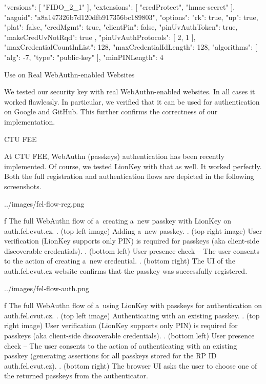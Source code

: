 \begtt
{
	"versions": [
		"FIDO_2_1"
	],
	"extensions": [
		"credProtect",
		"hmac-secret"
	],
	"aaguid": "a8a147326b7d120dfb917356bc189803",
	"options": {
		"rk": true,
		"up": true,
		"plat": false,
		"credMgmt": true,
		"clientPin": false,
		"pinUvAuthToken": true,
		"makeCredUvNotRqd": true
	},
	"pinUvAuthProtocols": [
		2,
		1
	],
	"maxCredentialCountInList": 128,
	"maxCredentialIdLength": 128,
	"algorithms": [
		{
			"alg": -7,
			"type": "public-key"
		}
	],
	"minPINLength": 4
}
\endtt


\sec Use on Real WebAuthn-enabled Websites

We tested our security key with real WebAuthn-enabled websites. In all cases it worked flawlessly. In particular, we verified that it can be used for authentication on {\sbf Google} and {\sbf GitHub}. This further confirms the correctness of our implementation.


\secc CTU FEE

At CTU FEE, WebAuthn (passkeys) authentication has been recently implemented. Of course, we tested LionKey with that as well. It worked perfectly. Both the full registration and authentication flows are depicted in the following screenshots.

\midinsert
{}
\picw=144mm \cinspic ../images/fel-flow-reg.png
\caption/f The full WebAuthn flow of a~creating a~new passkey with LionKey on auth.fel.cvut.cz. {.} (top left image) Adding a~new passkey. {.} (top right image) User verification (LionKey supports only PIN) is required for passkeys (aka client-side discoverable credentials). {.} (bottom left) User presence check – The user consents to the action of creating a~new credential. {.} (bottom right) The UI of the auth.fel.cvut.cz website confirms that the passkey was successfully registered.
\endinsert


\midinsert
{}
\picw=144mm \cinspic ../images/fel-flow-auth.png
\caption/f The full WebAuthn flow of a~using LionKey with passkeys for authentication on auth.fel.cvut.cz. {.} (top left image) Authenticating with an existing passkey. {.} (top right image) User verification (LionKey supports only PIN) is required for passkeys (aka client-side discoverable credentials). {.} (bottom left) User presence check – The user consents to the action of authenticating with an existing passkey (generating assertions for all passkeys stored for the RP ID auth.fel.cvut.cz). {.} (bottom right) The browser UI asks the user to choose one of the returned passkeys from the authenticator.
\endinsert

